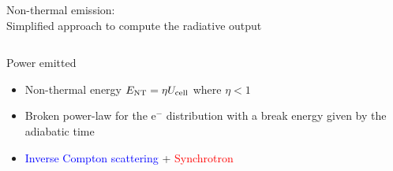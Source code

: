 \begin{frame}{Non-thermal emission:\\
	Simplified approach to compute the radiative output}
	\begin{columns}
		{\scriptsize
		\begin{column}{.5\textwidth}
			\begin{block}{Power emitted}
				\begin{itemize}
					\item Non-thermal energy $E_{\rm NT} = \eta U_{\rm cell}$ where $\eta<1$
					\item Broken power-law for the e$^{-}$ distribution with a break 
							energy given by the adiabatic time  \\
					\item \textcolor{blue}{Inverse Compton scattering} + \textcolor{red}{Synchrotron}


\end{itemize}
\end{block}
\end{column}}
\end{columns}
\end{frame}
